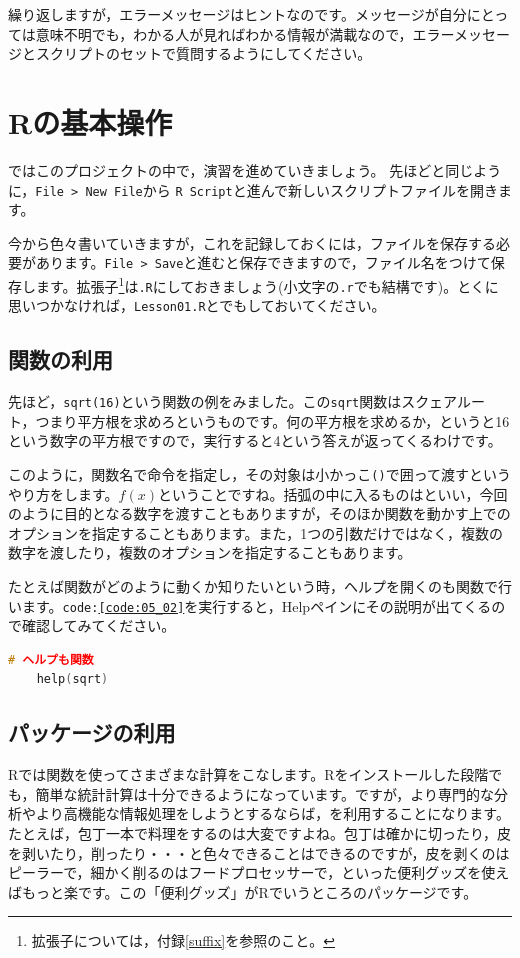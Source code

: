 \documentclass{ltjsbook}
\begin{document}
繰り返しますが，エラーメッセージはヒントなのです。メッセージが自分にとっては意味不明でも，わかる人が見ればわかる情報が満載なので，エラーメッセージとスクリプトのセットで質問するようにしてください。

\section{Rの基本操作}
ではこのプロジェクトの中で，演習を進めていきましょう。
先ほどと同じように，\verb|File > New File|から \verb|R Script|と進んで新しいスクリプトファイルを開きます。

今から色々書いていきますが，これを記録しておくには，ファイルを保存する必要があります。\verb|File > Save|と進むと保存できますので，ファイル名をつけて保存します。拡張子\footnote{拡張子については，付録\ref{suffix}を参照のこと。}は\texttt{.R}にしておきましょう(小文字の\texttt{.r}でも結構です)。とくに思いつかなければ，\texttt{Lesson01.R}とでもしておいてください。

\subsection{関数の利用}
先ほど，\texttt{sqrt(16)}という関数の例をみました。この\texttt{sqrt}関数はスクェアルート，つまり平方根を求めろというものです。何の平方根を求めるか，というと16という数字の平方根ですので，実行すると4という答えが返ってくるわけです。

このように，関数名で命令を指定し，その対象は小かっこ\verb|()|で囲って渡すというやり方をします。$f(x)$ということですね。括弧の中に入るものはといい，今回のように目的となる数字を渡すこともありますが，そのほか関数を動かす上でのオプションを指定することもあります。また，1つの引数だけではなく，複数の数字を渡したり，複数のオプションを指定することもあります。

たとえば関数がどのように動くか知りたいという時，ヘルプを開くのも関数で行います。\texttt{code:\ref{code:05_02}}を実行すると，Helpペインにその説明が出てくるので確認してみてください。
\begin{lstlisting}[language=c++,label={code:05_02},caption={ヘルプのコード}]
	# ヘルプも関数
	help(sqrt)
\end{lstlisting}
\subsection{パッケージの利用}
\label{HowToUseRpackage}
Rでは関数を使ってさまざまな計算をこなします。Rをインストールした段階でも，簡単な統計計算は十分できるようになっています。ですが，より専門的な分析やより高機能な情報処理をしようとするならば，を利用することになります。たとえば，包丁一本で料理をするのは大変ですよね。包丁は確かに切ったり，皮を剥いたり，削ったり・・・と色々できることはできるのですが，皮を剥くのはピーラーで，細かく削るのはフードプロセッサーで，といった便利グッズを使えばもっと楽です。この「便利グッズ」がRでいうところのパッケージです。
\end{document}
